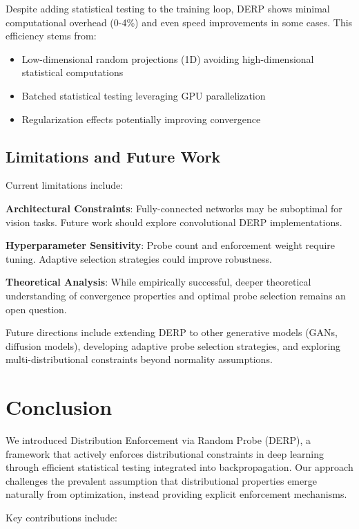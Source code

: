 \documentclass[11pt]{article}
\begin{document}
Despite adding statistical testing to the training loop, DERP shows minimal computational overhead (0-4\%) and even speed improvements in some cases. This efficiency stems from:

\begin{itemize}
\item Low-dimensional random projections (1D) avoiding high-dimensional statistical computations
\item Batched statistical testing leveraging GPU parallelization  
\item Regularization effects potentially improving convergence
\end{itemize}

\subsection{Limitations and Future Work}

Current limitations include:

\textbf{Architectural Constraints}: Fully-connected networks may be suboptimal for vision tasks. Future work should explore convolutional DERP implementations.

\textbf{Hyperparameter Sensitivity}: Probe count and enforcement weight require tuning. Adaptive selection strategies could improve robustness.

\textbf{Theoretical Analysis}: While empirically successful, deeper theoretical understanding of convergence properties and optimal probe selection remains an open question.

Future directions include extending DERP to other generative models (GANs, diffusion models), developing adaptive probe selection strategies, and exploring multi-distributional constraints beyond normality assumptions.

\section{Conclusion}

We introduced Distribution Enforcement via Random Probe (DERP), a framework that actively enforces distributional constraints in deep learning through efficient statistical testing integrated into backpropagation. Our approach challenges the prevalent assumption that distributional properties emerge naturally from optimization, instead providing explicit enforcement mechanisms.

Key contributions include:
\end{document}
